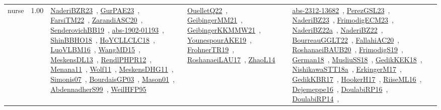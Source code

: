 {\begin{longtable}{p{3cm}r>{\raggedright\arraybackslash}p{6cm}>{\raggedright\arraybackslash}p{6cm}>{\raggedright\arraybackslash}p{8cm}}
\index{nurse}\index{ApplicationAreas!nurse}nurse &  1.00 & \href{../works/NaderiBZR23.pdf}{NaderiBZR23}~\cite{NaderiBZR23}, \href{../works/GurPAE23.pdf}{GurPAE23}~\cite{GurPAE23}, \href{../works/FarsiTM22.pdf}{FarsiTM22}~\cite{FarsiTM22}, \href{../works/ZarandiASC20.pdf}{ZarandiASC20}~\cite{ZarandiASC20}, \href{../works/SenderovichBB19.pdf}{SenderovichBB19}~\cite{SenderovichBB19}, \href{../works/abs-1902-01193.pdf}{abs-1902-01193}~\cite{abs-1902-01193}, \href{../works/ShinBBHO18.pdf}{ShinBBHO18}~\cite{ShinBBHO18}, \href{../works/HoYCLLCLC18.pdf}{HoYCLLCLC18}~\cite{HoYCLLCLC18}, \href{../works/LuoVLBM16.pdf}{LuoVLBM16}~\cite{LuoVLBM16}, \href{../works/WangMD15.pdf}{WangMD15}~\cite{WangMD15}, \href{../works/MeskensDL13.pdf}{MeskensDL13}~\cite{MeskensDL13}, \href{../works/RendlPHPR12.pdf}{RendlPHPR12}~\cite{RendlPHPR12}, \href{../works/Menana11.pdf}{Menana11}~\cite{Menana11}, \href{../works/Wolf11.pdf}{Wolf11}~\cite{Wolf11}, \href{../works/MeskensDHG11.pdf}{MeskensDHG11}~\cite{MeskensDHG11}, \href{../works/Simonis07.pdf}{Simonis07}~\cite{Simonis07}, \href{../works/BourdaisGP03.pdf}{BourdaisGP03}~\cite{BourdaisGP03}, \href{../works/Mason01.pdf}{Mason01}~\cite{Mason01}, \href{../works/AbdennadherS99.pdf}{AbdennadherS99}~\cite{AbdennadherS99}, \href{../works/WeilHFP95.pdf}{WeilHFP95}~\cite{WeilHFP95} & \href{../works/OuelletQ22.pdf}{OuelletQ22}~\cite{OuelletQ22}, \href{../works/GeibingerMM21.pdf}{GeibingerMM21}~\cite{GeibingerMM21}, \href{../works/GeibingerKKMMW21.pdf}{GeibingerKKMMW21}~\cite{GeibingerKKMMW21}, \href{../works/YounespourAKE19.pdf}{YounespourAKE19}~\cite{YounespourAKE19}, \href{../works/FrohnerTR19.pdf}{FrohnerTR19}~\cite{FrohnerTR19}, \href{../works/RoshanaeiLAU17.pdf}{RoshanaeiLAU17}~\cite{RoshanaeiLAU17}, \href{../works/ZhaoL14.pdf}{ZhaoL14}~\cite{ZhaoL14} & \href{../works/abs-2312-13682.pdf}{abs-2312-13682}~\cite{abs-2312-13682}, \href{../works/PerezGSL23.pdf}{PerezGSL23}~\cite{PerezGSL23}, \href{../works/NaderiBZ23.pdf}{NaderiBZ23}~\cite{NaderiBZ23}, \href{../works/FrimodigECM23.pdf}{FrimodigECM23}~\cite{FrimodigECM23}, \href{../works/NaderiBZ22a.pdf}{NaderiBZ22a}~\cite{NaderiBZ22a}, \href{../works/NaderiBZ22.pdf}{NaderiBZ22}~\cite{NaderiBZ22}, \href{../works/BourreauGGLT22.pdf}{BourreauGGLT22}~\cite{BourreauGGLT22}, \href{../works/FallahiAC20.pdf}{FallahiAC20}~\cite{FallahiAC20}, \href{../works/RoshanaeiBAUB20.pdf}{RoshanaeiBAUB20}~\cite{RoshanaeiBAUB20}, \href{../works/FrimodigS19.pdf}{FrimodigS19}~\cite{FrimodigS19}, \href{../works/German18.pdf}{German18}~\cite{German18}, \href{../works/MusliuSS18.pdf}{MusliuSS18}~\cite{MusliuSS18}, \href{../works/GedikKEK18.pdf}{GedikKEK18}~\cite{GedikKEK18}, \href{../works/NishikawaSTT18a.pdf}{NishikawaSTT18a}~\cite{NishikawaSTT18a}, \href{../works/ErkingerM17.pdf}{ErkingerM17}~\cite{ErkingerM17}, \href{../works/GedikKBR17.pdf}{GedikKBR17}~\cite{GedikKBR17}, \href{../works/HookerH17.pdf}{HookerH17}~\cite{HookerH17}, \href{../works/RiiseML16.pdf}{RiiseML16}~\cite{RiiseML16}, \href{../works/Dejemeppe16.pdf}{Dejemeppe16}~\cite{Dejemeppe16}, \href{../works/DoulabiRP16.pdf}{DoulabiRP16}~\cite{DoulabiRP16}, \href{../works/DoulabiRP14.pdf}{DoulabiRP14}~\cite{DoulabiRP14}, 
\end{longtable}}
